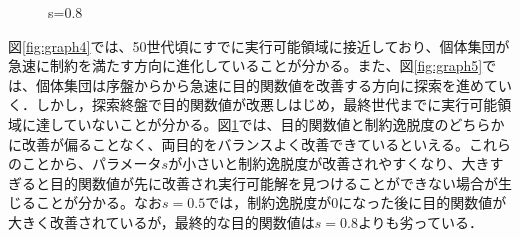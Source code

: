\documentclass[a4paper,12pt]{jsreport}
\begin{document}
\begin{figure}[htbp]
  \begin{center}
  \hfill
  \hfill
  \end{center}
    
  \caption{s=0.8}
  \label{fig:graph6}
\end{figure}

図\ref{fig:graph4}では、50世代頃にすでに実行可能領域に接近しており、個体集団が急速に制約を満たす方向に進化していることが分かる。また、図\ref{fig:graph5}では、個体集団は序盤からから急速に目的関数値を改善する方向に探索を進めていく．しかし，探索終盤で目的関数値が改悪しはじめ，最終世代までに実行可能領域に達していないことが分かる。図\ref{fig:graph6}では、目的関数値と制約逸脱度のどちらかに改善が偏ることなく、両目的をバランスよく改善できているといえる。これらのことから、パラメータ$s$が小さいと制約逸脱度が改善されやすくなり、大きすぎると目的関数値が先に改善され実行可能解を見つけることができない場合が生じることが分かる。なお$s=0.5$では，制約逸脱度が0になった後に目的関数値が大きく改善されているが，最終的な目的関数値は$s=0.8$よりも劣っている．
\end{document}
